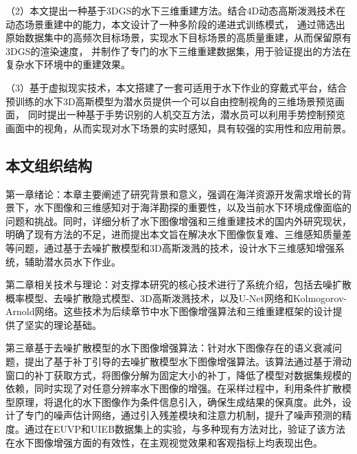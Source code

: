 （2）本文提出一种基于3DGS的水下三维重建方法。结合4D动态高斯泼溅技术在动态场景重建中的能力，本文设计了一种多阶段的递进式训练模式，
通过筛选出原始数据集中的高频次目标场景，实现水下目标场景的高质量重建，从而保留原有3DGS的渲染速度，
并制作了专门的水下三维重建数据集，用于验证提出的方法在复杂水下环境中的重建效果。

（3）基于虚拟现实技术，本文搭建了一套可适用于水下作业的穿戴式平台，结合预训练的水下3D高斯模型为潜水员提供一个可以自由控制视角的三维场景预览画面，
同时提出一种基于手势识别的人机交互方法，潜水员可以利用手势控制预览画面中的视角，从而实现对水下场景的实时感知，具有较强的实用性和应用前景。




\subsection{本文组织结构}
第一章绪论：本章主要阐述了研究背景和意义，强调在海洋资源开发需求增长的背景下，水下图像和三维感知对于海洋勘探的重要性，以及当前水下环境成像面临的问题和挑战。同时，详细分析了水下图像增强和三维重建技术的国内外研究现状，明确了现有方法的不足，进而提出本文旨在解决水下图像恢复难、三维感知质量差等问题，通过基于去噪扩散模型和3D高斯泼溅的技术，设计水下三维感知增强系统，辅助潜水员水下作业。

第二章相关技术与理论：对支撑本研究的核心技术进行了系统介绍，包括去噪扩散概率模型、去噪扩散隐式模型、3D高斯泼溅技术，以及U-Net网络和Kolmogorov-Arnold网络。这些技术为后续章节中水下图像增强算法和三维重建框架的设计提供了坚实的理论基础。

第三章基于去噪扩散模型的水下图像增强算法：针对水下图像存在的语义衰减问题，提出了基于补丁引导的去噪扩散模型水下图像增强算法。该算法通过基于滑动窗口的补丁获取方式，将图像分解为固定大小的补丁，降低了模型对数据集规模的依赖，同时实现了对任意分辨率水下图像的增强。在采样过程中，利用条件扩散模型原理，将退化的水下图像作为条件信息引入，确保生成结果的保真度。此外，设计了专门的噪声估计网络，通过引入残差模块和注意力机制，提升了噪声预测的精度。通过在EUVP和UIEB数据集上的实验，与多种现有方法对比，验证了该方法在水下图像增强方面的有效性，在主观视觉效果和客观指标上均表现出色。

